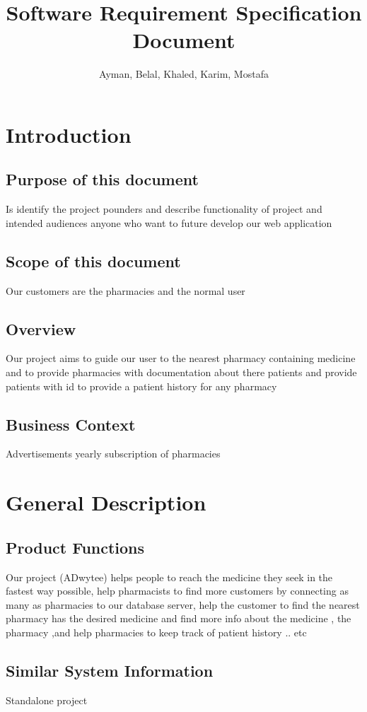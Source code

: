 \documentclass[]{article}
\title{Software Requirement Specification Document}
\author{Ayman, Belal, Khaled, Karim, Mostafa}
\begin{document}
\maketitle

\section{Introduction}
\subsection{Purpose of this document}
Is identify the project pounders and describe functionality of project and intended audiences anyone who want to future develop our web application
\subsection{ Scope of this document}
Our customers are the pharmacies and the normal  user
\subsection{Overview}
Our project aims to guide our user to the nearest pharmacy containing medicine and to provide pharmacies with documentation about there patients and provide patients with id to provide a patient history for any pharmacy  
\subsection{ Business Context}
Advertisements
\newline
yearly subscription of pharmacies


\section{General Description}
\subsection{Product Functions}
Our project (ADwytee) helps people to reach the medicine they seek in the fastest way possible, help pharmacists to find more customers by connecting as many as pharmacies to our database server, help the customer to find the nearest pharmacy has the desired medicine and find more info about the medicine , the pharmacy ,and help pharmacies to keep track of patient history  .. etc
\subsection{Similar System Information}
Standalone project 
\end{document}
